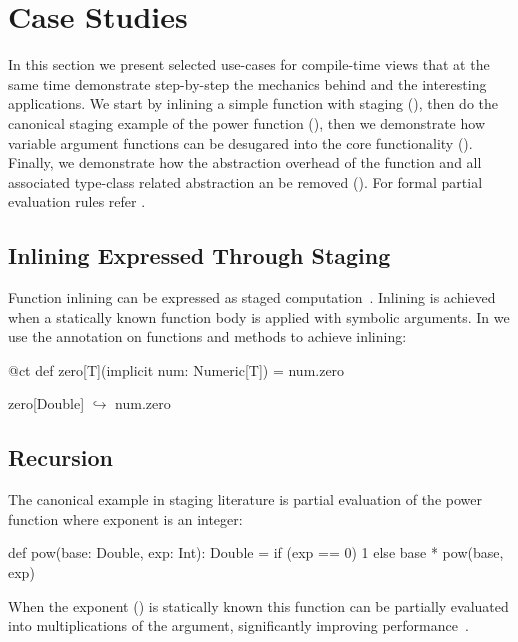 \section{Case Studies}
\label{sct:case-studies}

In this section we present selected use-cases for compile-time views that at the
same  time demonstrate step-by-step the mechanics behind \tool and the
interesting applications.  We start by inlining a simple function with staging
(), then do the canonical staging  example of the power function
(), then we demonstrate how variable argument functions can
be  desugared into the core functionality (). Finally, we
demonstrate how the abstraction overhead of the  function and all
associated type-class related abstraction an be removed ().
For formal partial evaluation rules refer \cf {}.

\subsection{Inlining Expressed Through Staging}
\label{sct:inlining}

Function inlining can be expressed as staged computation~\cite{monnier2003inlining}.
 Inlining is achieved when a statically known function body is applied with symbolic
 arguments. In \tool we use the  annotation on functions and methods to achieve inlining:\begin{lstparagraph}
@ct def zero[T](implicit num: Numeric[T]) = num.zero

zero[Double]
  $\hookrightarrow$ num.zero
\end{lstparagraph}


\subsection{Recursion}
\label{sct:recursion}

The canonical example in staging literature is partial evaluation of the power function
 where exponent is an integer:
\begin{lstparagraph}
def pow(base: Double, exp: Int): Double =
  if (exp == 0) 1 else base * pow(base, exp)
\end{lstparagraph} When the exponent () is statically known this function can be partially
evaluated into  multiplications of the  argument, significantly
improving performance~\cite{calcagno2003implementing}.

